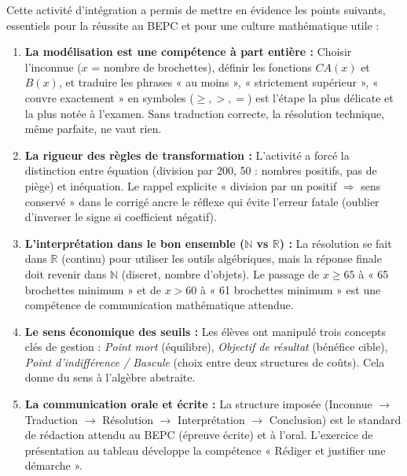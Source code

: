 \documentclass[11pt]{article}
\newcounter{popsec}
\newcounter{popsub}
\newcommand{\courssub}[1]{%
  \stepcounter{popsub}%
  \par\vspace{9pt}\noindent{\popxbold\fontsize{11.5}{13}\selectfont\color{popink}{\color{poporange}\thepopsec.\thepopsub}\hspace{6pt}#1}\par\nopagebreak\vspace{4pt}
}
\begin{document}
\courssub{Bilan de l'activité}
Cette activité d'intégration a permis de mettre en évidence les points suivants, essentiels pour la réussite au BEPC et pour une culture mathématique utile :

\begin{enumerate}
    \item \textbf{La modélisation est une compétence à part entière :} Choisir l'inconnue ($x$ = nombre de brochettes), définir les fonctions $CA(x)$ et $B(x)$, et traduire les phrases « au moins », « strictement supérieur », « couvre exactement » en symboles ($\geq, >, =$) est l'étape la plus délicate et la plus notée à l'examen. Sans traduction correcte, la résolution technique, même parfaite, ne vaut rien.
    \item \textbf{La rigueur des règles de transformation :} L'activité a forcé la distinction entre équation (division par 200, 50 : nombres positifs, pas de piège) et inéquation. Le rappel explicite « division par un positif $\Rightarrow$ sens conservé » dans le corrigé ancre le réflexe qui évite l'erreur fatale (oublier d'inverser le signe si coefficient négatif).
    \item \textbf{L'interprétation dans le bon ensemble ($\mathbb{N}$ vs $\mathbb{R}$) :} La résolution se fait dans $\mathbb{R}$ (continu) pour utiliser les outils algébriques, mais la réponse finale doit revenir dans $\mathbb{N}$ (discret, nombre d'objets). Le passage de $x \geq 65$ à « 65 brochettes minimum » et de $x > 60$ à « 61 brochettes minimum » est une compétence de communication mathématique attendue.
    \item \textbf{Le sens économique des seuils :} Les élèves ont manipulé trois concepts clés de gestion : \emph{Point mort} (équilibre), \emph{Objectif de résultat} (bénéfice cible), \emph{Point d'indifférence / Bascule} (choix entre deux structures de coûts). Cela donne du sens à l'algèbre abstraite.
    \item \textbf{La communication orale et écrite :} La structure imposée (Inconnue $\rightarrow$ Traduction $\rightarrow$ Résolution $\rightarrow$ Interprétation $\rightarrow$ Conclusion) est le standard de rédaction attendu au BEPC (épreuve écrite) et à l'oral. L'exercice de présentation au tableau développe la compétence « Rédiger et justifier une démarche ».
\end{enumerate}
\end{document}
